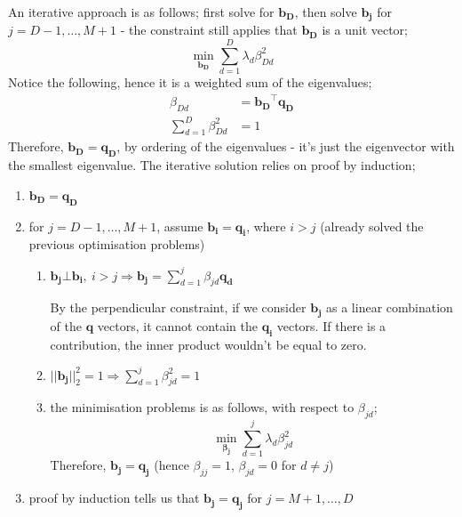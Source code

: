 \documentclass[a4paper, 12pt]{article}
\newcommand{\summation}[2]{\sum\limits_{#1}^{#2}}
\newcommand{\mat}[1]{\boldsymbol{#1}}
\begin{document}
                An iterative approach is as follows; first solve for $\mat{b_D}$, then solve $\mat{b_j}$ for $j = D - 1, \dots, M + 1$ - the constraint still applies that $\mat{b_D}$ is a unit vector;
                $$\min_{\mat{b_D}} \summation{d = 1}{D} \lambda_d \beta_{Dd}^2$$
                Notice the following, hence it is a weighted sum of the eigenvalues;
                \begin{align*}
                    \beta_{Dd} & = \mat{b_D}^\top\mat{q_D} \\
                    \summation{d = 1}{D} \beta_{Dd}^2 & = 1
                \end{align*}
                Therefore, $\mat{b_D} = \mat{q_D}$, by ordering of the eigenvalues - it's just the eigenvector with the smallest eigenvalue.
                The iterative solution relies on proof by induction;
                \begin{enumerate}
                    \itemsep0em
                    \item $\mat{b_D} = \mat{q_D}$
                    \item for $j = D - 1, \dots, M + 1$, assume $\mat{b_i} = \mat{q_i}$, where $i > j$ (already solved the previous optimisation problems)
                        \begin{enumerate}
                            \itemsep0em
                            \item $\mat{b_j} \bot \mat{b_i},\ i > j \Rightarrow \mat{b_j} = \summation{d = 1}{j} \beta_{jd}\mat{q_d}$
                                \smallskip

                                By the perpendicular constraint, if we consider $\mat{b_j}$ as a linear combination of the $\mat{q}$ vectors, it cannot contain the $\mat{q_i}$ vectors.
                                If there is a contribution, the inner product wouldn't be equal to zero.
                            \item $|| \mat{b_j} ||_2^2 = 1 \Rightarrow \summation{d = 1}{j} \beta_{jd}^2 = 1$
                            \item the minimisation problems is as follows, with respect to $\beta_{jd}$;
                                $$\min_{\mat{\beta_j}} \summation{d = 1}{j} \lambda_d \beta_{jd}^2$$
                                Therefore, $\mat{b_j} = \mat{q_j}$ (hence $\beta_{jj} = 1$, $\beta_{jd} = 0$ for $d \neq j$)
                        \end{enumerate}
                    \item proof by induction tells us that $\mat{b_j} = \mat{q_j}$ for $j = M + 1, \dots, D$
                \end{enumerate}
\end{document}
